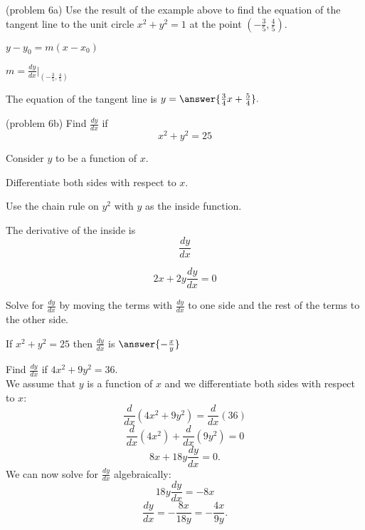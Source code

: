 \documentclass[handout]{ximera}
\begin{document}
\begin{center}
\begin{foldable}
\end{foldable}
\end{center}

\begin{problem}(problem 6a)
Use the result of the example above to find the equation of the tangent line to the unit circle $x^2 + y^2 = 1$ at the point $(-\tfrac35,\tfrac45).$

\begin{hint}
$y-y_0 = m(x-x_0)$
\end{hint}
\begin{hint}
$m = \frac{dy}{dx}\bigg|_{(-\frac35, \frac45)}$
\end{hint}
The equation of the tangent line is $y = \answer{\frac34 x+\frac54}.$
\end{problem}


\begin{problem}(problem 6b)
  Find $\frac{dy}{dx}$ if
  \[
  x^2 + y^2 = 25
  \]
  
	  
    \begin{hint}
      Consider $y$ to be a function of $x$.
    \end{hint}
		\begin{hint}
		  Differentiate both sides with respect to $x$.
		\end{hint}
    \begin{hint}
      Use the chain rule on $y^2$ with $y$ as the inside function.
    \end{hint}
    \begin{hint}
      The derivative of the inside is 
      \[
      \frac{dy}{dx}
      \]
    \end{hint}
		\begin{hint}
		  \[
			2x + 2y\frac{dy}{dx} = 0
			\]
		\end{hint}
		\begin{hint}
		  Solve for $\frac{dy}{dx}$ by moving the terms with $\frac{dy}{dx}$
			to one side and the 
			rest of the terms to the other side.
		\end{hint}
    
		If $x^2 + y^2 = 25$ then $\frac{dy}{dx}$ is
		 $\answer{-\frac{x}{y}}$
		
\end{problem}




\begin{example}[example 7]
Find  $\frac{dy}{dx}$ if $4x^2 + 9y^2 = 36$.\\
We assume that $y$ is a function of $x$ and we differentiate both 
sides with respect to $x$:
\[\frac{d}{dx}(4x^2 + 9y^2)  = \frac{d}{dx} (36)\]
\[\frac{d}{dx}(4x^2) + \frac{d}{dx} (9y^2) = 0\]
\[8x + 18y\frac{dy}{dx} = 0.\]
We can now solve for $\displaystyle{\frac{dy}{dx}}$ algebraically:
\[18y\frac{dy}{dx} = -8x\]
\[\frac{dy}{dx} = -\frac{8x}{18y}= -\frac{4x}{9y}.\]
\end{example}
\end{document}
